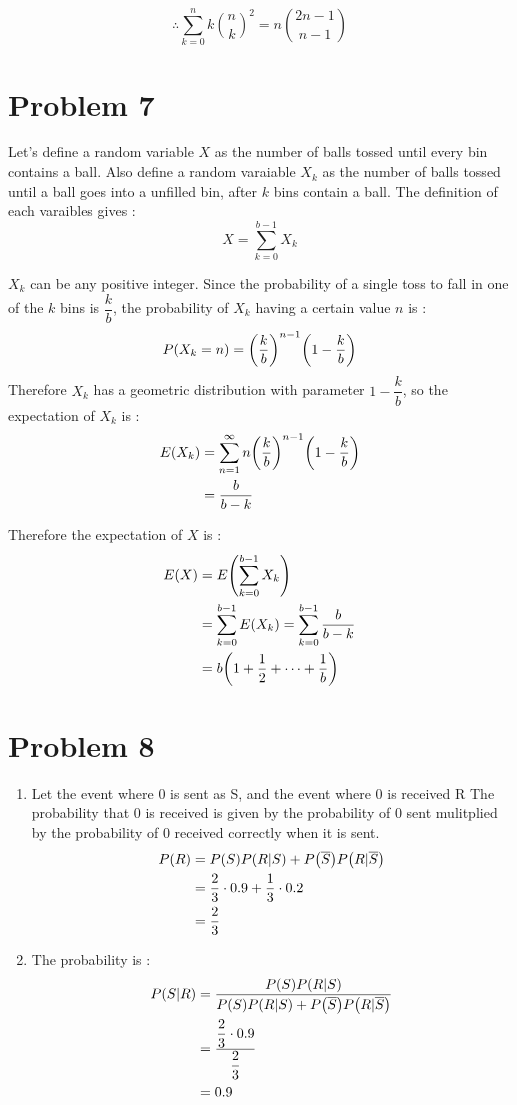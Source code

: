 \documentclass[10pt]{article}
\begin{document}
$$\therefore \sum_{k=0}^{n}k{n \choose k}^2 = n{2n-1 \choose n-1}$$

\section*{Problem 7}

Let's define a random variable $X$ as the number of balls tossed until every bin contains a ball.
Also define a random varaiable $X_k$ as the number of balls tossed until a ball goes into a unfilled bin, after $k$ bins contain a ball.
The definition of each varaibles gives :
$$X = \sum_{k=0}^{b-1}X_k$$

$X_k$ can be any positive integer. Since the probability of a single toss to fall in one of the $k$ bins is $\dfrac{k}{b}$, the probability of $X_k$ having a certain value $n$ is :
$$P(X_k = n) = \qty(\frac{k}{b})^{n-1}\qty(1-\frac{k}{b})$$
Therefore $X_k$ has a geometric distribution with parameter $1 - \dfrac{k}{b}$, so the expectation of $X_k$ is :
\begin{align*}
    E\qty(X_k) &= \sum_{n=1}^{\infty}n\qty(\frac{k}{b})^{n-1}\qty(1-\frac{k}{b}) \\
    &= \frac{b}{b-k}
\end{align*}

Therefore the expectation of $X$ is :
\begin{align*}
    E(X) &= E\qty(\sum_{k=0}^{b-1}X_k) \\
    &= \sum_{k=0}^{b-1}E\qty(X_k) = \sum_{k=0}^{b-1}\frac{b}{b-k} \\
    &= b\qty(1 + \frac{1}{2} + \cdots + \frac{1}{b})
\end{align*}

\section*{Problem 8}

\begin{enumerate}[leftmargin=*]
    \item Let the event where 0 is sent as S, and the event where 0 is received R
    The probability that 0 is received is given by the probability of 0 sent mulitplied by the probability of 0 received correctly when it is sent.
    \begin{align*}
        P(R) &= P(S)P(R|S) + P\qty(\overline{S})P\qty(R|\overline{S}) \\
        &= \frac{2}{3}\cdot 0.9 + \frac{1}{3}\cdot 0.2 \\
        &= \frac{2}{3}
    \end{align*}
    \item The probability is :
    \begin{align*}
        P(S|R) &= \frac{P(S)P(R|S)}{P(S)P(R|S) + P\qty(\overline{S})P\qty(R|\overline{S})} \\
        &= \frac{\dfrac{2}{3}\cdot 0.9}{\dfrac{2}{3}} \\
        &= 0.9
    \end{align*}
\end{enumerate}
\end{document}
